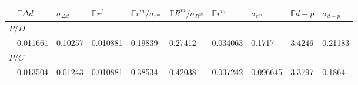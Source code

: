 \begin{tabular}{@{}llllllllll@{}}
\toprule 
 & $\mathbb{E}\Delta d$ & $\sigma_{\Delta d}$ & $\mathbb{E}r^f$ & $\mathbb{E}r^m/\sigma _{r^m}$ & $\mathbb{E}R^m/\sigma _{R^m}$ & $\mathbb{E}r^m$ & $\sigma_{r^m}$ & $\mathbb{E}d-p$ & $\sigma_{d-p}$  \\ 
\midrule 
\multicolumn{10}{l}{$P/D$}\\
 &0.011661&0.10257& 0.010881 & 0.19839 & 0.27412 & 0.034063 & 0.1717 & 3.4246 & 0.21183 \\ 
\multicolumn{10}{l}{$P/C$}\\
 &0.013504&0.01243& 0.010881 & 0.38534 & 0.42038 & 0.037242 & 0.096645 & 3.3797 & 0.1864 \\ 
\bottomrule 
\end{tabular}

